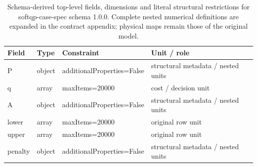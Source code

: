 \begin{table}[htbp]\centering\footnotesize
\caption{Schema-derived top-level fields, dimensions and literal structural restrictions for softqp-case-spec schema 1.0.0. Complete nested numerical definitions are expanded in the contract appendix; physical maps remain those of the original model.}\label{tab:contract-softqp-case-spec}
\begin{tabularx}{\textwidth}{@{}>{\raggedright\arraybackslash}p{}>{\raggedright\arraybackslash}p{}>{\raggedright\arraybackslash}X>{\raggedright\arraybackslash}X@{}}\toprule
Field & Type & Constraint & Unit / role\\\midrule
P & object & additionalProperties=\allowbreak{}False & structural metadata /\allowbreak{} nested units\\
q & array & maxItems=\allowbreak{}20000 & cost /\allowbreak{} decision unit\\
A & object & additionalProperties=\allowbreak{}False & structural metadata /\allowbreak{} nested units\\
lower & array & maxItems=\allowbreak{}20000 & original row unit\\
upper & array & maxItems=\allowbreak{}20000 & original row unit\\
penalty & object & additionalProperties=\allowbreak{}False & structural metadata /\allowbreak{} nested units\\
\bottomrule\end{tabularx}
\end{table}
